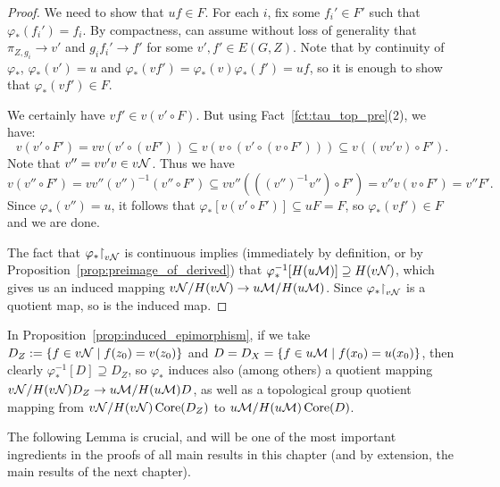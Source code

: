 \begin{proof}
		We need to show that $uf\in F$. For each $i$, fix some $f_i'\in F'$ such that $\varphi_*(f_i')=f_i$. By compactness, can assume without loss of generality that $\pi_{Z,g_i}\to v'$ and $g_if_i'\to f'$ for some $v',f'\in E(G,Z)$. Note that by continuity of $\varphi_*$, $\varphi_*(v')=u$ and $\varphi_*(vf')=\varphi_*(v)\varphi_*(f')=uf$, so it is enough to show that $\varphi_*(vf')\in F$.
		
		We certainly have $vf'\in v(v'\circ F)$. But using Fact~\ref{fct:tau_top_pre}(2), we have:
		\[
			v(v'\circ F')= vv(v'\circ (vF'))\subseteq v(v\circ (v'\circ(v\circ F')))\subseteq v((vv'v)\circ F').
		\]
		Note that $v''=vv'v\in v{\mathcal N}$. Thus we have
		\[
			v(v''\circ F')=vv''(v'')^{-1}(v''\circ F')\subseteq vv''(((v'')^{-1}v'')\circ F')=v''v(v\circ F')=v''F'.
		\]
		Since $\varphi_*(v'')=u$, it follows that $\varphi_*[v(v'\circ F')]\subseteq uF=F$, so $\varphi_*(vf')\in F$ and we are done.
		
		
		The fact that $\varphi_*\mathord{\upharpoonright}_{v{\mathcal N}}$ is continuous implies (immediately by definition, or by Proposition~\ref{prop:preimage_of_derived}) that $\varphi_*^{-1}[H(u{\mathcal M})]\supseteq H(v{\mathcal N})$, which gives us an induced mapping $v{\mathcal N}/H(v{\mathcal N})\to u{\mathcal M}/H(u{\mathcal M})$. Since $\varphi_*\mathord{\upharpoonright}_{v{\mathcal N}}$ is a quotient map, so is the induced map.
	\end{proof}
	
	\begin{rem}
		\label{rem:induced_hom_by_D}
		In Proposition~\ref{prop:induced_epimorphism}, if we take $D_Z:=\{f\in v{\mathcal N}\mid f(z_0)=v(z_0) \}$ and $D=D_X=\{f\in u{\mathcal M}\mid f(x_0)=u(x_0) \}$, then clearly $\varphi_*^{-1}[D]\supseteq D_Z$, so $\varphi_*$ induces also (among others) a quotient mapping $v{\mathcal N}/H(v{\mathcal N})D_Z\to u{\mathcal M}/H(u{\mathcal M})D$, as well as a topological group quotient mapping from $v{\mathcal N}/H(v{\mathcal N})\operatorname{{Core}}(D_Z)$ to $u{\mathcal M}/H(u{\mathcal M})\operatorname{{Core}}(D)$.\xqed{\lozenge}
	\end{rem}
	
	The following Lemma is crucial, and will be one of the most important ingredients in the proofs of all main results in this chapter (and by extension, the main results of the next chapter).
	
